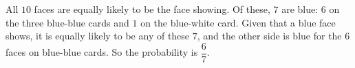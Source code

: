 All $10$ faces are equally likely to be the face showing. Of these, $7$ are blue: $6$ on the three blue-blue cards and $1$ on the blue-white card. Given that a blue face shows, it is equally likely to be any of these $7$, and the other side is blue for the $6$ faces on blue-blue cards. So the probability is $\boxed{\dfrac{6}{7}}$.
